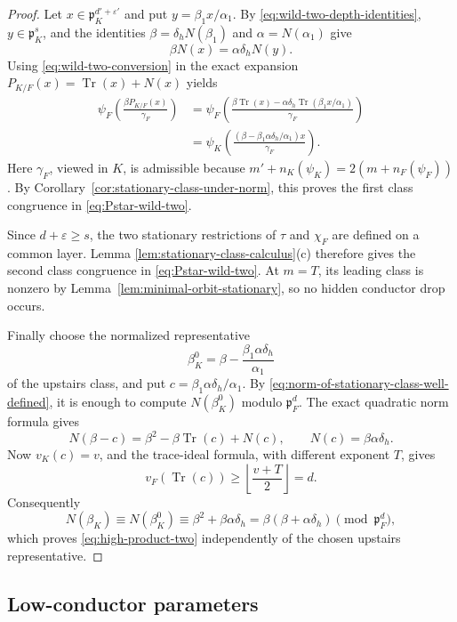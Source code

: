 \documentclass[11pt]{amsart}
\theoremstyle{definition}
\theoremstyle{remark}
\newcommand{\p}{\mathfrak p}
\newcommand{\Tr}{\operatorname{Tr}}
\begin{document}
\begin{proof}
Let $x\in\p_K^{d'+\varepsilon'}$ and put
$y=\beta_1x/\alpha_1$.  By
\eqref{eq:wild-two-depth-identities}, $y\in\p_K^s$, and the identities
$\beta=\delta_hN(\beta_1)$ and $\alpha=N(\alpha_1)$ give
\[
 \beta N(x)=\alpha\delta_hN(y).
\]
Using \eqref{eq:wild-two-conversion} in the exact expansion
$P_{K/F}(x)=\Tr(x)+N(x)$ yields
\begin{align*}
 \psi_F\!\left(\frac{\beta P_{K/F}(x)}{\gamma_F}\right)
 &=\psi_F\!\left(
   \frac{\beta\Tr(x)-
    \alpha\delta_h\Tr(\beta_1x/\alpha_1)}{\gamma_F}\right)\\
 &=\psi_K\!\left(
   \frac{(\beta-\beta_1\alpha\delta_h/\alpha_1)x}{\gamma_F}
   \right).
\end{align*}
Here $\gamma_F$, viewed in $K$, is admissible because
$m'+n_K(\psi_K)=2(m+n_F(\psi_F))$.  By
Corollary~\ref{cor:stationary-class-under-norm}, this proves the first
class congruence in \eqref{eq:Pstar-wild-two}.

Since $d+\varepsilon\ge s$, the two stationary restrictions of $\tau$
and $\chi_F$ are defined on a common layer.  Lemma
\ref{lem:stationary-class-calculus}(c) therefore gives the second class
congruence in \eqref{eq:Pstar-wild-two}.  At $m=T$, its leading class
is nonzero by Lemma~\ref{lem:minimal-orbit-stationary}, so no hidden
conductor drop occurs.

Finally choose the normalized representative
\[
 \beta_K^0=\beta-\frac{\beta_1\alpha\delta_h}{\alpha_1}
\]
of the upstairs class, and put
$c=\beta_1\alpha\delta_h/\alpha_1$.  By
\eqref{eq:norm-of-stationary-class-well-defined}, it is enough to
compute $N(\beta_K^0)$ modulo $\p_F^d$.  The exact quadratic norm
formula gives
\[
 N(\beta-c)=\beta^2-\beta\Tr(c)+N(c),
 \qquad N(c)=\beta\alpha\delta_h.
\]
Now $v_K(c)=v$, and the trace-ideal formula, with different exponent
$T$, gives
\[
 v_F(\Tr(c))\ge
 \left\lfloor\frac{v+T}{2}\right\rfloor=d.
\]
Consequently
\[
 N(\beta_K)\equiv N(\beta_K^0)
 \equiv\beta^2+\beta\alpha\delta_h
 =\beta(\beta+\alpha\delta_h)\pmod{\p_F^d},
\]
which proves \eqref{eq:high-product-two} independently of the chosen
upstairs representative.
\end{proof}

\subsection{Low-conductor parameters}
\end{document}
